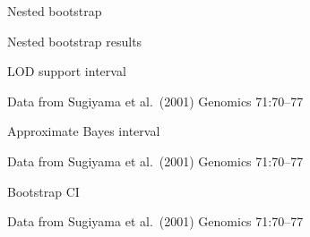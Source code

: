 \documentclass[aspectratio=169,12pt,t]{beamer}
\begin{document}
\begin{frame}[c]{Nested bootstrap}



\note{
}
\end{frame}






\begin{frame}[c]{Nested bootstrap results}



\note{
}
\end{frame}








\begin{frame}{}


\note{
}
\end{frame}



\begin{frame}{LOD support interval}



\vfill

\hfill {\footnotesize \lolit Data from Sugiyama et al.\ (2001) Genomics 71:70--77}

\note{
}

\end{frame}




\begin{frame}{Approximate Bayes interval}



\vfill

\hfill {\footnotesize \lolit Data from Sugiyama et al.\ (2001) Genomics 71:70--77}

\note{
}
\end{frame}



\begin{frame}{Bootstrap CI}



\vfill

\hfill {\footnotesize \lolit Data from Sugiyama et al.\ (2001) Genomics 71:70--77}

\note{
}
\end{frame}
\end{document}
